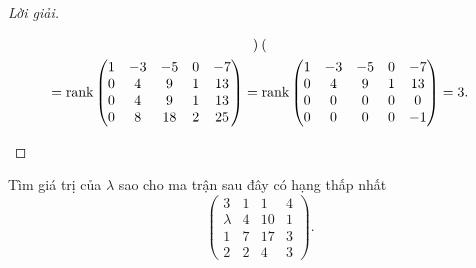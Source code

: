 \documentclass[class=nhvh-linear-algebra,crop=false]{standalone}
\begin{document}
\begin{proof}[Lời giải]
\begin{enumerate}[label = (\alph*)]
\begin{gather*}
\begin{pmatrix}
			      \end{pmatrix} \\
			      =\text{rank}\begin{pmatrix}
				      1 & -3 & -5 & 0 & -7 \\
				      0 & 4  & 9  & 1 & 13 \\
				      0 & 4  & 9  & 1 & 13 \\
				      0 & 8  & 18 & 2 & 25
			      \end{pmatrix}
			      =\text{rank}\begin{pmatrix}
				      1 & -3 & -5 & 0 & -7 \\
				      0 & 4  & 9  & 1 & 13 \\
				      0 & 0  & 0  & 0 & 0  \\
				      0 & 0  & 0  & 0 & -1
			      \end{pmatrix}
			      = 3.
		      \end{gather*}
		      \endgroup{}
	\end{enumerate}
\end{proof}

\begin{exercise}
	\par Tìm giá trị của $\lambda$ sao cho ma trận sau đây có hạng thấp nhất
	\[
		\begin{pmatrix}
			3       & 1 & 1  & 4 \\
			\lambda & 4 & 10 & 1 \\
			1       & 7 & 17 & 3 \\
			2       & 2 & 4  & 3
		\end{pmatrix}.
	\]
\end{exercise}
\end{document}
